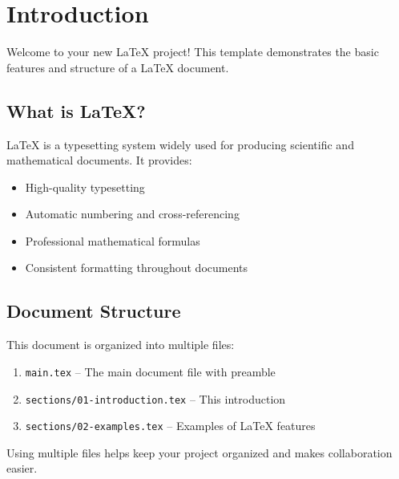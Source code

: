 \section{Introduction}

Welcome to your new LaTeX project! This template demonstrates the basic features and structure of a LaTeX document.

\subsection{What is LaTeX?}

LaTeX is a typesetting system widely used for producing scientific and mathematical documents. It provides:

\begin{itemize}
    \item High-quality typesetting
    \item Automatic numbering and cross-referencing
    \item Professional mathematical formulas
    \item Consistent formatting throughout documents
\end{itemize}

\subsection{Document Structure}

This document is organized into multiple files:

\begin{enumerate}
    \item \texttt{main.tex} -- The main document file with preamble
    \item \texttt{sections/01-introduction.tex} -- This introduction
    \item \texttt{sections/02-examples.tex} -- Examples of LaTeX features
\end{enumerate}

Using multiple files helps keep your project organized and makes collaboration easier.
